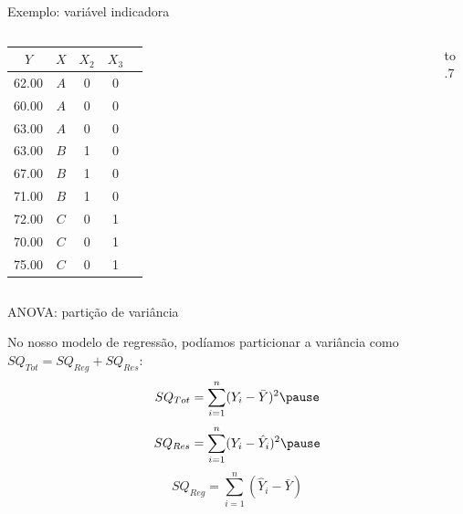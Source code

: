 \documentclass{beamer}\usepackage[]{graphicx}\usepackage[]{color}
\begin{document}
\begin{frame}{Exemplo: variável indicadora}

\begin{columns}[c]


\begin{tabular}{cc|ccc}
  \hline
  $Y$ & $X$ & $X_2$ & $X_3$ \\ 
  \hline
  62.00 & $A$ & 0 & 0\\ 
  60.00 & $A$ & 0 & 0\\ 
  63.00 & $A$ & 0 & 0\\ 
  63.00 & $B$ & 1 & 0\\ 
  67.00 & $B$ & 1 & 0\\ 
  71.00 & $B$ & 1 & 0\\ 
  72.00 & $C$ & 0 & 1\\ 
  70.00 & $C$ & 0 & 1\\ 
  75.00 & $C$ & 0 & 1\\ 
  \hline
\end{tabular}
\pause
{}
\vbox to .7%

\end{columns}

\end{frame}


\begin{frame}{ANOVA: partição de variância}

No nosso modelo de regressão, podíamos particionar a variância como $SQ_{Tot} = SQ_{Reg} + SQ_{Res}$: 
\vfill
\begin{equation*}
SQ_{Tot} = \sum_{i=1}^{n}(Y_i - \bar Y)^2 \pause
\end{equation*}
\vfill
\begin{equation*}
SQ_{Res} = \sum_{i=1}^{n}(Y_i - \hat Y_i)^2 \pause
\end{equation*}
\vfill
\begin{equation*}
SQ_{Reg} = \sum_{i=1}^{n}(\hat Y_i - \bar Y)
\end{equation*}

\end{frame}
\end{document}
